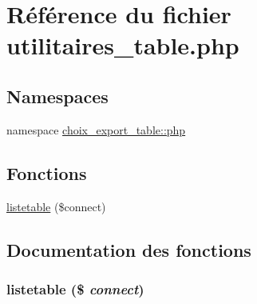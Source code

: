 \hypertarget{utilitaires__table_8php}{
\section{R\'{e}f\'{e}rence du fichier utilitaires\_\-table.php}
\label{utilitaires__table_8php}
}
\subsection*{Namespaces}
\begin{CompactItemize}
\item 
namespace \hyperlink{namespacechoix__export__table_1_1php}{choix\_\-export\_\-table::php}
\end{CompactItemize}
\subsection*{Fonctions}
\begin{CompactItemize}
\item 
\hyperlink{utilitaires__table_8php_a0}{listetable} (\$connect)
\end{CompactItemize}


\subsection{Documentation des fonctions}
\hypertarget{utilitaires__table_8php_a0}{
\subsubsection[listetable]{\setlength{\rightskip}{0pt plus 5cm}listetable (\$ {\em connect})}}
\label{utilitaires__table_8php_a0}


